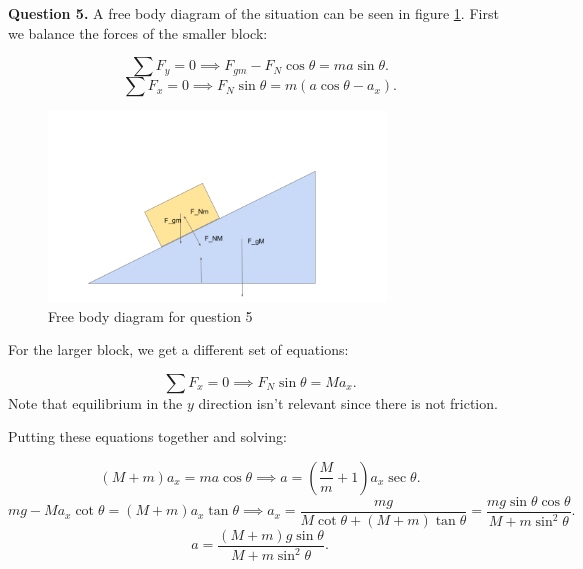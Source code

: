 \documentclass[letterpaper, reqno,11pt]{article}
\begin{document}
{\noindent\bf Question 5.} A free body diagram of the situation can be seen in figure \ref{fig:q5}. First we balance the forces of the smaller block: 

\[
\sum F_y=0\implies F_{gm}-F_{N}\cos\theta=m a\sin\theta
.\]
\[
\sum F_x=0\implies F_{N}\sin\theta=m(a\cos\theta-a_x)
.\]

\begin{figure}[htpb]
    \centering
    \includegraphics[width=0.8\textwidth]{q5}
    \caption{Free body diagram for question 5}
    \label{fig:q5}
\end{figure}

For the larger block, we get a different set of equations: 

\[
\sum F_x=0\implies F_N\sin\theta=Ma_x
.\]
Note that equilibrium in the $y$ direction isn't relevant since there is not friction. 

Putting these equations together and solving: 

\[
    (M+m)a_x=ma\cos\theta\implies a=(\frac{M}{m}+1)a_x \sec\theta
.\]
\[
    mg-Ma_x\cot\theta=(M+m)a_x\tan\theta\implies a_x=\frac{mg}{M\cot\theta+(M+m)\tan\theta}=\frac{mg\sin\theta\cos\theta}{M+m\sin^2\theta}
.\]
\[
a=\frac{(M+m)g\sin\theta}{M+m\sin^2\theta}
.\]
\end{document}
